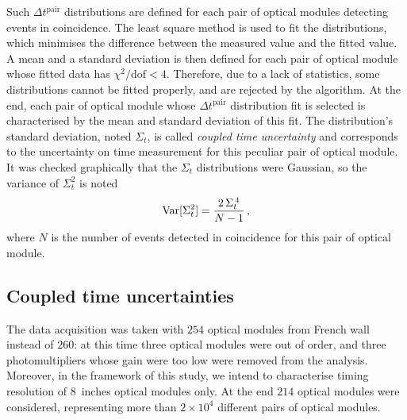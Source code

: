 Such  $\Delta t^{\text{pair}}$ distributions are defined for each pair of optical modules detecting events in coincidence.
The least square method is used to fit the distributions, which minimises the difference between the measured value and the fitted value.
A mean and a standard deviation is then defined for each pair of optical module whose fitted data has $\chi^{2}/\text{dof}<4$.
Therefore, due to a lack of statistics, some distributions cannot be fitted properly, and are rejected by the algorithm.
At the end, each pair of optical module whose $\Delta t^{\text{pair}}$ distribution fit is selected is characterised by the mean and standard deviation of this fit.
The distribution's standard deviation, noted $\Sigma_{t}$, is called \emph{coupled time uncertainty} and corresponds to the uncertainty on time measurement for this peculiar pair of optical module.
It was checked graphically that the $\Sigma_{t}$ distributions were Gaussian, so the variance of $\Sigma_{t}^{2}$ is noted
\begin{equation}
  \mathrm{Var}[\Sigma_{t}^{2}] = \frac{2\,\Sigma_{t}^{\,4}}{N-1}\,,
  \label{eq:var_sigma_pair}
\end{equation}
where $N$ is the number of events detected in coincidence for this pair of optical module.

\subsection{Coupled time uncertainties}

The data acquisition was taken with $254$ optical modules from French wall instead of $260$: at this time three optical modules were out of order, and three photomultipliers whose gain were too low were removed from the analysis.
Moreover, in the framework of this study, we intend to characterise timing resolution of $8$~inches optical modules only.
At the end $214$ optical modules were considered, representing more than ${2\times10^{4}}$ different pairs of optical modules.

